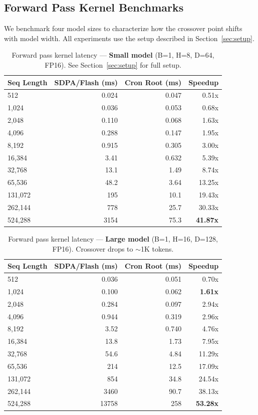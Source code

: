 \documentclass{article}
\begin{document}
    \subsection{Forward Pass Kernel Benchmarks}

    We benchmark four model sizes to characterize how the crossover point shifts with model width. All experiments use the setup described in Section~\ref{sec:setup}.

    \begin{table}[h]
    \centering
    \caption{Forward pass kernel latency --- \textbf{Small model} (B=1, H=8, D=64, FP16). See Section~\ref{sec:setup} for full setup.}
    \begin{tabular}{lrrr}
    \toprule
    Seq Length & SDPA/Flash (ms) & Cron Root (ms) & Speedup \\
    \midrule
    512 & 0.024 & 0.047 & 0.51x \\
    1,024 & 0.036 & 0.053 & 0.68x \\
    2,048 & 0.110 & 0.068 & 1.63x \\
    4,096 & 0.288 & 0.147 & 1.95x \\
    8,192 & 0.915 & 0.305 & 3.00x \\
    16,384 & 3.41 & 0.632 & 5.39x \\
    32,768 & 13.1 & 1.49 & 8.74x \\
    65,536 & 48.2 & 3.64 & 13.25x \\
    131,072 & 195 & 10.1 & 19.43x \\
    262,144 & 778 & 25.7 & 30.33x \\
    524,288 & 3154 & 75.3 & \textbf{41.87x} \\
    \bottomrule
    \end{tabular}
    \label{tab:kernel_small}
    \end{table}

    \begin{table}[h]
    \centering
    \caption{Forward pass kernel latency --- \textbf{Large model} (B=1, H=16, D=128, FP16). Crossover drops to $\sim$1K tokens.}
    \begin{tabular}{lrrr}
    \toprule
    Seq Length & SDPA/Flash (ms) & Cron Root (ms) & Speedup \\
    \midrule
    512 & 0.036 & 0.051 & 0.70x \\
    1,024 & 0.100 & 0.062 & \textbf{1.61x} \\
    2,048 & 0.284 & 0.097 & 2.94x \\
    4,096 & 0.944 & 0.319 & 2.96x \\
    8,192 & 3.52 & 0.740 & 4.76x \\
    16,384 & 13.8 & 1.73 & 7.95x \\
    32,768 & 54.6 & 4.84 & 11.29x \\
    65,536 & 214 & 12.5 & 17.09x \\
    131,072 & 854 & 34.8 & 24.54x \\
    262,144 & 3460 & 90.7 & 38.13x \\
    524,288 & 13758 & 258 & \textbf{53.28x} \\
    \bottomrule
    \end{tabular}
    \label{tab:kernel_large}
    \end{table}
\end{document}
